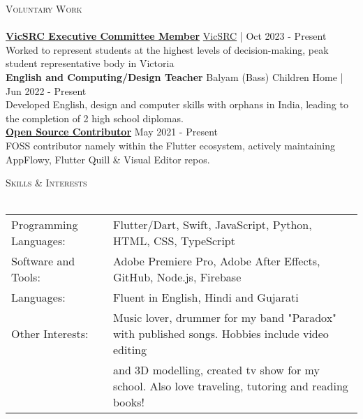 \documentclass[a4paper]{article}
\newcommand{\lineunder} {
    \vspace*{-8pt} \\
    \hspace*{-10pt} \hrulefill \\
}
\newcommand{\header} [1] {
    {\hspace*{-10pt}\vspace*{6pt} \textsc{#1}}
    \vspace*{-6pt} \lineunder
}
\begin{document}
\header{Voluntary Work}
\href{https://vicsrc.org.au/about/executive-committee}{\ul{\textbf{VicSRC Executive Committee Member}}} \hfill \href{https://vicsrc.org.au/}{VicSRC} | Oct 2023 - Present\\
Worked to represent students at the highest levels of decision-making, peak student representative body in Victoria\\
\vspace*{1.5mm}
{\textbf{English and Computing/Design Teacher}} \hfill Balyam (Bass) Children Home | Jun 2022 - Present\\
Developed English, design and computer skills with orphans in India, leading to the completion of 2 high school diplomas. \\
\vspace*{1.5mm}
\href{https://github.com/garv-shah}{\textbf{\ul{Open Source Contributor}}} \hfill May 2021 - Present\\
FOSS contributor namely within the Flutter ecosystem, actively maintaining AppFlowy, Flutter Quill \& Visual Editor repos.\\
\vspace*{1.5mm}

\header{Skills & Interests}
\begin{tabular}{ l l }
	Programming Languages: & Flutter/Dart, Swift, JavaScript, Python, HTML, CSS, TypeScript     \\
	Software and Tools:    & Adobe Premiere Pro, Adobe After Effects, GitHub, Node.js, Firebase \\
    Languages:    & Fluent in English, Hindi and Gujarati \\
    Other Interests:    & Music lover, drummer for my band "Paradox" with published songs. Hobbies include video editing \\
                        & and 3D modelling, created tv show for my school. Also love traveling, tutoring and reading books! \\
\end{tabular}

\vspace*{-80pt}
\end{document}
